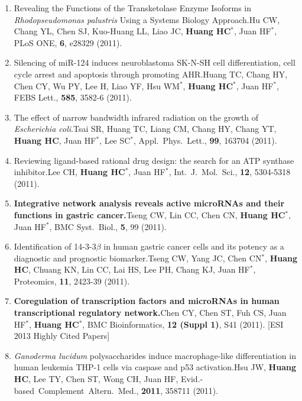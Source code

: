 \documentclass[10pt,a4paper]{article}
\def\mypub#1#2#3{{#1.}\newline #2, #3.}
\def\mybpub#1#2#3{{\boldmath \bf #1.}\newline #2, #3.}
\def\cited#1{Cited $\ge$ #1}
\begin{document}
\begin{enumerate}
\item
\mypub{Revealing the Functions of the Transketolase Enzyme Isoforms in \textsl{Rhodopseudomonas palustris} Using a Systems Biology Approach}
{Hu CW, Chang YL, Chen SJ, Kuo-Huang LL, Liao JC, {\bf Huang HC$^{*}$}, Juan HF$^{*}$}
{PLoS ONE, {\bf 6}, e28329 (2011)}

\item
\mypub{Silencing of miR-124 induces neuroblastoma SK-N-SH cell differentiation, cell cycle arrest and apoptosis through promoting AHR}
{Huang TC, Chang HY, Chen CY, Wu PY, Lee H, Liao YF, Hsu WM$^{*}$, {\bf Huang HC$^{*}$}, Juan HF$^{*}$}
{FEBS Lett., {\bf 585}, 3582-6 (2011)}

\item
\mypub{The effect of narrow bandwidth infrared radiation on the growth of \textsl{Escherichia coli}}
{Tsai SR, Huang TC, Liang CM, Chang HY, Chang YT, {\bf Huang HC}, Juan HF$^{*}$, Lee SC$^{*}$}
{Appl.\ Phys.\ Lett., {\bf 99}, 163704 (2011)}

\item
\mypub{Reviewing ligand-based rational drug design: the search for an ATP synthase inhibitor}
{Lee CH, {\bf Huang HC$^{*}$}, Juan HF$^{*}$}
{Int.\ J.\ Mol.\ Sci., {\bf 12}, 5304-5318 (2011)}

\item
\mybpub{Integrative network analysis reveals active microRNAs and their functions in gastric cancer}
{Tseng CW, Lin CC, Chen CN, {\bf Huang HC$^{*}$}, Juan HF$^{*}$}
{BMC Syst.\ Biol., {\bf 5}, 99 (2011)}

\item
\mypub
{Identification of 14-3-3$\beta$ in human gastric cancer cells and its potency as a diagnostic and prognostic biomarker}
{Tseng CW, Yang JC, Chen CN$^{*}$, {\bf Huang HC}, Chuang KN, Lin CC, Lai HS, Lee PH, Chang KJ, Juan HF$^{*}$}
{Proteomics, {\bf 11}, 2423-39 (2011)} 

\item
\mybpub{Coregulation of transcription factors and microRNAs in human transcriptional regulatory network}
{Chen CY, Chen ST, Fuh CS, Juan HF$^{*}$, {\bf Huang HC$^{*}$}}
{BMC Bioinformatics, {\bf 12 (Suppl 1)}, S41 (2011)} 
[ESI 2013 {Highly Cited Papers}]

\item
\mypub{\textsl{Ganoderma lucidum} polysaccharides induce macrophage-like differentiation in human leukemia THP-1 cells via caspase and p53 activation}
{Hsu JW, {\bf Huang HC}, Lee TY, Chen ST, Wong CH, Juan HF}
{Evid.-based\ Complement\ Altern.\ Med., {\bf 2011}, 358711 (2011)}


\end{enumerate}
\end{document}
